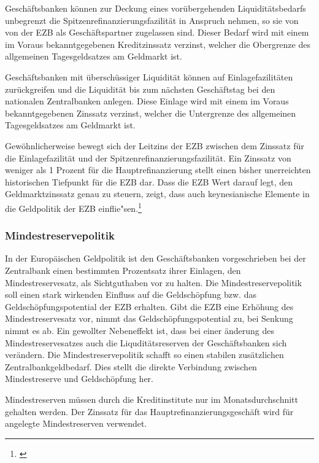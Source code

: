 \documentclass[
        onecolumn,
        a4paper,
        abstracton,
        parskip=half
        ,final
        ]{scrartcl}
\begin{document}
Gesch{\"a}ftsbanken k{\"o}nnen zur Deckung eines vor{\"u}bergehenden Liquidit{\"a}tsbedarfs unbegrenzt die Spitzenrefinanzierungsfazilit{\"a}t in Anspruch nehmen, so sie von von der EZB als Gesch{\"a}ftspartner zugelassen sind. Dieser Bedarf wird mit einem im Voraus bekanntgegebenen Kreditzinssatz verzinst, welcher die Obergrenze des allgemeinen Tagesgeldsatzes am Geldmarkt ist.

Gesch{\"a}ftsbanken mit {\"u}bersch{\"u}ssiger Liquidit{\"a}t  k{\"o}nnen auf Einlagefazilit{\"a}ten zur{\"u}ckgreifen und die Liquidit{\"a}t bis zum n{\"a}chsten Gesch{\"a}ftstag bei den nationalen Zentralbanken anlegen. Diese Einlage wird mit einem im Voraus bekanntgegebenen Zinssatz verzinst, welcher die Untergrenze des allgemeinen Tagesgeldsatzes am Geldmarkt ist.

Gew{\"o}hnlicherweise bewegt sich der Leitzins der EZB zwischen dem Zinssatz f{\"u}r die Einlagefazilit{\"a}t und der Spitzenrefinanzierungsfazilit{\"a}t. Ein Zinssatz von weniger als 1 Prozent f{\"u}r die Hauptrefinanzierung stellt einen bisher unerreichten historischen Tiefpunkt f{\"u}r die EZB dar.
Dass die EZB Wert darauf legt, den Geldmarktzinssatz genau zu steuern, zeigt, dass auch keynesianische Elemente in die Geldpolitik der EZB einflie{"s}en.\footnote[59]{\citep*[vgl.][S.562f]{Basseler2010}}

\subsubsection{Mindestreservepolitik}   %
In der Europ{\"a}ischen Geldpolitik ist den Gesch{\"a}ftsbanken vorgeschrieben bei der Zentralbank einen bestimmten Prozentsatz ihrer Einlagen, den Mindestreservesatz, als Sichtguthaben vor zu halten. Die Mindestreservepolitik\citep*[vgl.][S.562f]{Basseler2010} soll einen stark wirkenden Einfluss auf die Geldsch{\"o}pfung bzw. das Geldsch{\"o}pfungspotential der EZB erhalten. Gibt die EZB eine Erh{\"o}hung des Mindestreservesatz vor, nimmt das Geldsch{\"o}pfungspotential zu, bei Senkung nimmt es ab.
Ein gewollter Nebeneffekt ist, dass bei einer {\"a}nderung des Mindestreservesatzes auch die Liqudit{\"a}tsreserven der Gesch{\"a}ftsbanken sich ver{\"a}ndern.
Die Mindestreservepolitik schafft so einen stabilen zus{\"a}tzlichen Zentralbankgeldbedarf. Dies stellt die direkte Verbindung zwischen Mindestreserve und Geldsch{\"o}pfung her.

Mindestreserven m{\"u}ssen durch die Kreditinstitute nur im Monatsdurchschnitt gehalten werden. Der Zinssatz f{\"u}r das Hauptrefinanzierungsgesch{\"a}ft wird f{\"u}r angelegte Mindestreserven verwendet.
\end{document}
